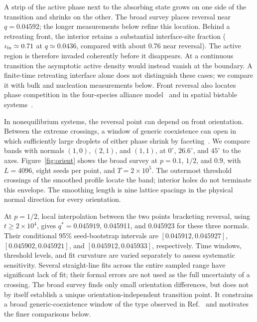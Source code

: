 \documentclass[pre,twocolumn,superscriptaddress,showpacs,floatfix]{revtex4-2}
\begin{document}
A strip of the active phase next to the absorbing state grows on one side of
the transition and shrinks on the other. The broad survey places reversal
near $q=0.04592$; the longer measurements below refine this location.
Behind a retreating front, the interior retains a substantial interface-site
fraction ($\iota_{\rm in}\simeq0.71$ at $q\simeq0.0436$, compared with about
0.76 near reversal). The active region is therefore invaded coherently before
it disappears. At a continuous transition the asymptotic active density would
instead vanish at the boundary. A finite-time retreating interface alone
does not distinguish these cases; we compare it with bulk and nucleation
measurements below. Front reversal also locates phase competition in the
four-species alliance model~\cite{szabo2004} and in spatial bistable
systems~\cite{durrett1994,durrett2009}.

In nonequilibrium systems, the reversal point can depend on front orientation.
Between the extreme crossings, a window of generic coexistence can open in
which sufficiently large droplets of either phase shrink by
faceting~\cite{toom1980,bennett1985,wang2015}. We compare bands with normals
$(1,0)$, $(2,1)$, and $(1,1)$, at $0^\circ$, $26.6^\circ$, and $45^\circ$
to the axes. Figure~\ref{fig:orient} shows the broad survey at $p=0.1$, $1/2$,
and $0.9$, with $L=4096$, eight seeds per point, and $T=2\times10^5$.
The outermost threshold crossings of the smoothed profile locate the band;
interior holes do not terminate this envelope. The smoothing length is nine
lattice spacings in the physical normal direction for every orientation.

At $p=1/2$, local interpolation between the two points bracketing reversal,
using $t\ge2\times10^4$, gives $q^*=0.045919$, 0.045911, and 0.045923 for
these three normals. Their conditional 95\% seed-bootstrap intervals are
$[0.045912,0.045927]$, $[0.045902,0.045921]$, and
$[0.045912,0.045933]$, respectively. Time windows, threshold levels, and fit
curvature are varied separately to assess systematic sensitivity. Several
straight-line fits across the entire sampled range have significant lack of
fit; their formal errors are not used as the full uncertainty of a crossing.
The broad survey finds only small orientation differences, but does not by
itself establish a unique orientation-independent transition point. It
constrains a broad generic-coexistence window of the type observed in
Ref.~\cite{wang2015} and motivates the finer comparisons below.
\end{document}
